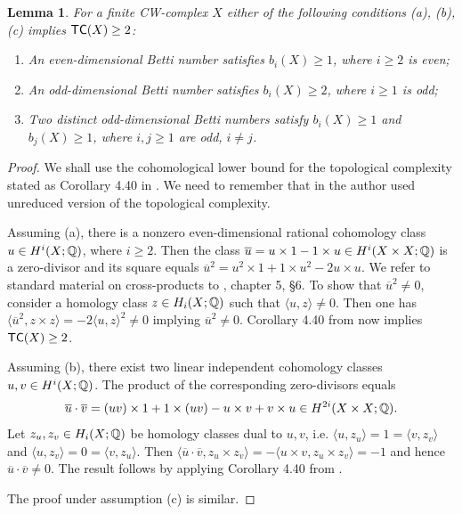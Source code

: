 \documentclass[11pt,twoside, reqno]{amsart}
\theoremstyle{plain}
\newtheorem{lema}{Lemma}
\theoremstyle{definition}
\newcommand{\tc}{{\sf{TC}}}
\begin{document}
\begin{lema}\label{lm:tc2}
For a finite CW-complex $X$ either of the following conditions (a), (b), (c) implies $\tc(X)\ge 2$:
\begin{enumerate}
\item[{(a)}] An even-dimensional Betti number satisfies $b_i(X)\ge 1$, where $i\ge 2$ is even;
\item[{(b)}] An odd-dimensional Betti number satisfies $b_i(X)\ge 2$, where $i\ge 1$ is odd;
\item[{(c)}]  Two distinct odd-dimensional Betti numbers satisfy $b_i(X)\ge 1$ and $b_j(X)\ge 1$, where $i, j\ge 1$ are odd, $i\not=j$. 
\end{enumerate}
\end{lema}
\begin{proof}
We shall use the cohomological lower bound for the topological complexity stated as Corollary 4.40 in \cite{Far2}. We need to remember that in \cite{Far2}  the author used unreduced version of the topological complexity. 

Assuming (a), there is a nonzero even-dimensional rational cohomology class $u\in H^i(X;\Bbb Q)$, where $i\ge 2$. Then the class 
$\overline u= u\times 1-1\times u\in H^i(X\times X;\Bbb Q)$ is a zero-divisor and its square equals  
$\overline u^2=u^2\times 1+1\times u^2 -2u\times u.$ 
We refer to standard material on cross-products to \cite{S}, chapter 5, \S 6. 
To show that $\overline u^2\not=0$, consider a homology class $z\in H_i(X;\Bbb Q)$ such that 
$\langle u, z\rangle \not=0$. Then one has $\langle \overline u^2, z\times z\rangle = -2 \langle u, z\rangle^2\not=0$ implying $\overline u^2\not=0$. 
Corollary 4.40 from \cite{Far2} now implies $\tc(X)\ge 2$. 

Assuming (b), there exist two linear independent cohomology classes $u, v\in H^i(X;\Bbb Q)$. The product of the corresponding zero-divisors equals
$$
\overline u\cdot \overline v = (uv)\times 1+1\times (uv) -u\times v+v\times u \in H^{2i}(X\times X;\Bbb Q).
$$
Let $z_u, z_v\in H_i(X;\Bbb Q)$ be homology classes dual to $u, v$, i.e. $\langle u, z_u\rangle =1=\langle v, z_v\rangle$ and $\langle u, z_v\rangle=0=\langle v, z_u\rangle$. Then 
$\langle \overline u\cdot \overline v, z_u\times z_v\rangle =- \langle u\times v, z_u\times z_v\rangle = - 1$ and hence $\overline u\cdot \overline v\not=0$. 
The result follows by applying Corollary 4.40 from \cite{Far2}. 

The proof under assumption (c) is similar. 
\end{proof}
\end{document}
